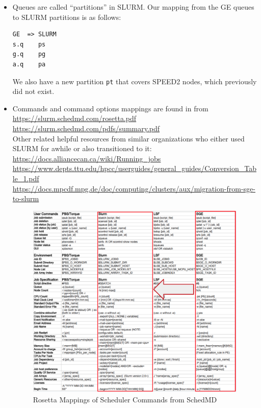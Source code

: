 \documentclass{easychair}
\begin{document}
\begin{itemize}
\item
Queues are called ``partitions'' in SLURM. Our mapping from the GE queues
to SLURM partitions is as follows:
\begin{verbatim}
GE  => SLURM
s.q    ps
g.q    pg
a.q    pa
\end{verbatim}
We also have a new partition \texttt{pt} that covers SPEED2 nodes,
which previously did not exist.

\item
Commands and command options mappings are found in  from\\
\url{https://slurm.schedmd.com/rosetta.pdf}\\
\url{https://slurm.schedmd.com/pdfs/summary.pdf}\\
Other related helpful resources from similar organizations who either used
SLURM for awhile or also transitioned to it:\\
\small
\url{https://docs.alliancecan.ca/wiki/Running_jobs}\\
\url{https://www.depts.ttu.edu/hpcc/userguides/general_guides/Conversion_Table_1.pdf}\\
\url{https://docs.mpcdf.mpg.de/doc/computing/clusters/aux/migration-from-sge-to-slurm}
\normalsize

\begin{figure}[htpb]
\includegraphics[width=\columnwidth]{images/rosetta-mapping}
\caption{Rosetta Mappings of Scheduler Commands from SchedMD}
\label{fig:rosetta-mappings}
\end{figure}


\end{itemize}
\end{document}

